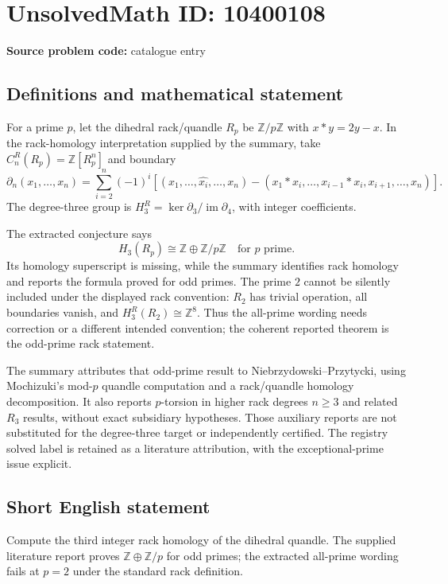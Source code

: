 \documentclass[11pt]{article}
\begin{document}
\section*{UnsolvedMath ID: 10400108}
\textbf{Source problem code:} catalogue entry
\subsection{Definitions and mathematical statement}
For a prime \(p\), let the dihedral rack/quandle \(R_p\) be \(\mathbb Z/p\mathbb Z\) with \(x*y=2y-x\). In the rack-homology interpretation supplied by the summary, take \(C_n^R(R_p)=\mathbb Z[R_p^n]\) and boundary
\[
 \partial_n(x_1,\ldots,x_n)=\sum_{i=2}^n(-1)^i
 \left[(x_1,\ldots,\widehat{x_i},\ldots,x_n)
 -(x_1*x_i,\ldots,x_{i-1}*x_i,x_{i+1},\ldots,x_n)\right].
\]
The degree-three group is \(H_3^R=\ker\partial_3/\operatorname{im}\partial_4\), with integer coefficients.

The extracted conjecture says
\[
 H_3(R_p)\cong\mathbb Z\oplus\mathbb Z/p\mathbb Z
 \quad\text{for }p\text{ prime}.
\]
Its homology superscript is missing, while the summary identifies rack homology and reports the formula proved for odd primes. The prime \(2\) cannot be silently included under the displayed rack convention: \(R_2\) has trivial operation, all boundaries vanish, and \(H_3^R(R_2)\cong\mathbb Z^8\). Thus the all-prime wording needs correction or a different intended convention; the coherent reported theorem is the odd-prime rack statement.

The summary attributes that odd-prime result to Niebrzydowski--Przytycki, using Mochizuki's mod-\(p\) quandle computation and a rack/quandle homology decomposition. It also reports \(p\)-torsion in higher rack degrees \(n\ge3\) and related \(R_3\) results, without exact subsidiary hypotheses. Those auxiliary reports are not substituted for the degree-three target or independently certified. The registry solved label is retained as a literature attribution, with the exceptional-prime issue explicit.
\subsection{Short English statement}
Compute the third integer rack homology of the dihedral quandle. The supplied literature report proves \(\mathbb Z\oplus\mathbb Z/p\) for odd primes; the extracted all-prime wording fails at \(p=2\) under the standard rack definition.
\end{document}
